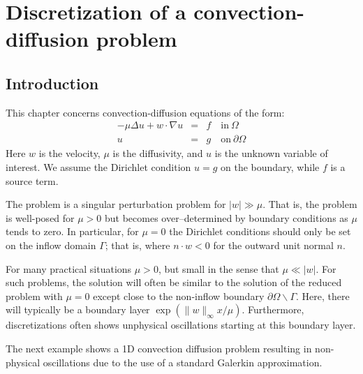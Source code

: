 \chapter{Discretization of a convection-diffusion problem}



\label{chap-conv}
\section{Introduction}
This chapter concerns convection-diffusion equations of the form: 
\begin{eqnarray*}
-\mu\Delta u + w\cdot \nabla u  &=& f \quad \textrm{in}\ \Omega\\
u&=& g \quad \textrm{on}\ \partial\Omega
\end{eqnarray*}
Here $w$ is  the velocity, $\mu$ is the diffusivity,  and $u$ is the 
unknown variable of interest. We assume the Dirichlet condition $u=g$ on 
the boundary, while $f$ is a source term.  

The problem is a singular perturbation problem for $|w| \gg \mu$. That is, the problem is well-posed for $\mu > 0$ but becomes over--determined by boundary conditions  as $\mu$ tends to zero. In particular,  for $\mu=0$ the Dirichlet conditions should only be set on the inflow domain $\Gamma$; that is, where $n \cdot w < 0$ for the outward unit normal $n$. 

For many practical situations $\mu>0$, but small in the sense that $\mu \ll |w|$. For such problems, the solution 
will often be similar to the solution of the reduced problem with $\mu=0$ except close to the 
non-inflow boundary $\partial \Omega \backslash \Gamma$. Here, there will typically be a boundary layer $\exp{(\|w\|_\infty x / \mu)}$.      
Furthermore, discretizations often shows unphysical oscillations starting at this boundary layer.    

The next example shows a 1D convection diffusion problem resulting in non-physical oscillations due to the use
of a standard Galerkin approximation. 

